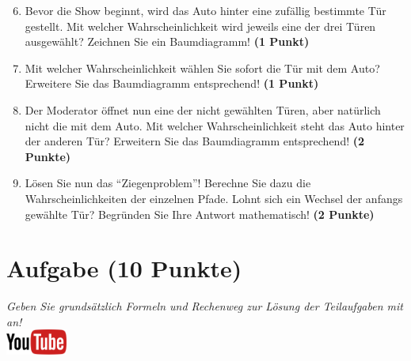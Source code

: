 \documentclass[a4paper, 10pt]{scrartcl}\usepackage[]{graphicx}\usepackage[]{xcolor}
\begin{document}
\begin{enumerate}
  \setcounter{enumi}{5}  
\item Bevor die Show beginnt, wird das Auto hinter eine zuf{\"a}llig bestimmte
  T{\"u}r gestellt. Mit welcher Wahrscheinlichkeit wird jeweils eine der drei
  T{\"u}ren ausgew{\"a}hlt? Zeichnen Sie ein Baumdiagramm! \textbf{(1 Punkt)}
\item Mit welcher Wahrscheinlichkeit w{\"a}hlen Sie sofort die T{\"u}r mit
  dem Auto? Erweitere Sie das Baumdiagramm entsprechend! \textbf{(1
    Punkt)}
\item Der Moderator {\"o}ffnet nun eine der nicht gew{\"a}hlten T{\"u}ren, aber
  nat{\"u}rlich nicht die mit dem Auto. Mit welcher Wahrscheinlichkeit steht
  das Auto hinter der anderen T{\"u}r? Erweitern Sie das Baumdiagramm
  entsprechend! \textbf{(2 Punkte)}
\item L{\"o}sen Sie nun das "`Ziegenproblem"'! Berechne Sie dazu die
  Wahrscheinlichkeiten der einzelnen Pfade. Lohnt sich ein Wechsel der
  anfangs gew{\"a}hlte T{\"u}r? Begr{\"u}nden Sie Ihre Antwort mathematisch!
  \textbf{(2 Punkte)}
\end{enumerate}
 






 
\clearpage

\section{Aufgabe \hfill (10 Punkte)}

\textit{Geben Sie grunds{\"a}tzlich Formeln und Rechenweg zur L{\"o}sung der
  Teilaufgaben mit an!} \\[1Ex]

\hfill\href{https://youtu.be/paXxVmyfDPs}{\includegraphics[width =
  2cm]{img/youtube}} %
\hspace{2Ex}
\end{document}
